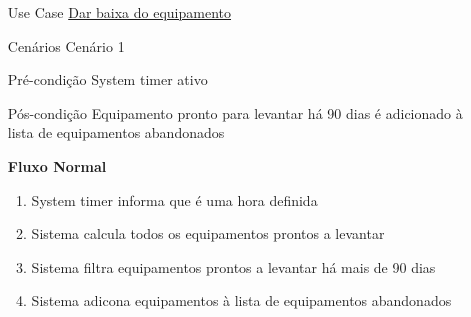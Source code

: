 \documentclass[../relatorio.tex]{subfiles}
\begin{document}
\begin{itemize}
    \item[Use Case] {\underline{Dar baixa do equipamento}}
    \item[Cenários] {Cenário 1}
    \item[Pré-condição] {System timer ativo}
    \item[Pós-condição] {Equipamento pronto para levantar há 90 dias é adicionado à lista de equipamentos abandonados}
          \begin{flushleft}
              \textbf{Fluxo Normal}
          \end{flushleft}
          \begin{enumerate}
              \item System timer informa que é uma hora definida
              \item Sistema calcula todos os equipamentos prontos a levantar
              \item Sistema filtra equipamentos prontos a levantar há mais de 90 dias
              \item Sistema adicona equipamentos à lista de equipamentos abandonados
          \end{enumerate}
\end{itemize}
\end{document}
